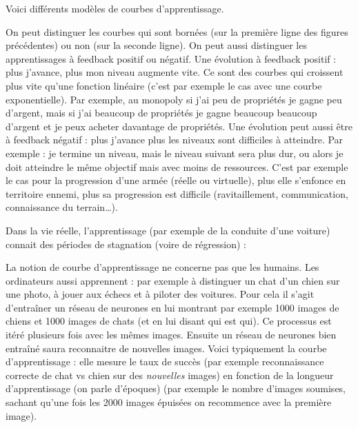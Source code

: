 \documentclass[11pt,class=report,crop=false]{standalone}
\begin{document}
Voici différents modèles de courbes d'apprentissage.



On peut distinguer les courbes qui sont bornées (sur la première ligne des figures précédentes) ou non (sur la seconde ligne).
On peut aussi distinguer les apprentissages à feedback positif ou négatif.
Une évolution à feedback positif : plus j'avance, plus mon niveau augmente vite. Ce sont des courbes qui croissent plus vite qu'une fonction linéaire (c'est par exemple le cas avec une courbe exponentielle). Par exemple, au monopoly si j'ai peu de propriétés je gagne peu d'argent, mais si j'ai beaucoup de propriétés je gagne beaucoup beaucoup d'argent et je peux acheter davantage de propriétés. Une évolution peut aussi être à feedback négatif : plus j'avance plus les niveaux sont difficiles à atteindre. Par exemple : je termine un niveau, mais le niveau suivant sera plus dur, ou alors je doit atteindre le même objectif mais avec moins de ressources. C'est par exemple le cas pour la progression d'une armée (réelle ou virtuelle), plus elle s'enfonce en territoire ennemi, plus sa progression est difficile (ravitaillement, communication, connaissance du terrain\ldots).


Dans la vie réelle, l'apprentissage (par exemple de la conduite d'une voiture) connait des périodes de stagnation (voire de régression) :


La notion de courbe d'apprentissage ne concerne pas que les humains. 
Les ordinateurs aussi apprennent : par exemple à distinguer un chat d'un chien sur une photo, à jouer aux échecs et à piloter des voitures. Pour cela il s'agit d'entraîner un \og{}réseau de neurones\fg{} en lui montrant par exemple 1000 images de chiens et 1000 images de chats (et en lui disant qui est qui). Ce processus est itéré plusieurs fois avec les mêmes images. Ensuite un réseau de neurones bien entraîné saura reconnaitre de nouvelles images.
Voici typiquement la courbe d'apprentissage : elle mesure le taux de succès (par exemple reconnaissance correcte de chat vs chien sur des \emph{nouvelles} images) en fonction de la longueur d'apprentissage (on parle d'\og{}époques\fg{}) (par exemple le nombre d'images soumises, sachant qu'une fois les 2000 images épuisées on recommence avec la première image).
\end{document}
